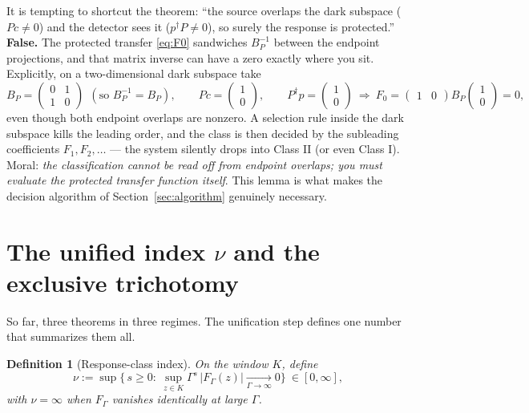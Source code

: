 \documentclass[11pt]{article}
\newtheorem{definition}{Definition}
\begin{document}
It is tempting to shortcut the theorem: ``the source overlaps the dark
subspace ($Pc\neq0$) and the detector sees it ($p^\dagger P\neq0$), so surely
the response is protected.''  \textbf{False.}  The protected transfer
\eqref{eq:F0} sandwiches $B_P^{-1}$ between the endpoint projections, and
that matrix inverse can have a zero exactly where you sit.  Explicitly, on a
two-dimensional dark subspace take
\[
B_P=\begin{pmatrix}0&1\\1&0\end{pmatrix}
\ \ (\text{so } B_P^{-1}=B_P),\qquad
Pc = \begin{pmatrix}1\\0\end{pmatrix},\qquad
P^\dagger p = \begin{pmatrix}1\\0\end{pmatrix}
\ \Longrightarrow\
F_0 = \begin{pmatrix}1&0\end{pmatrix}B_P\begin{pmatrix}1\\0\end{pmatrix}=0,
\]
even though both endpoint overlaps are nonzero.  A selection rule inside the
dark subspace kills the leading order, and the class is then decided by the
subleading coefficients $F_1,F_2,\dots$ --- the system silently drops into
Class II (or even Class I).  Moral: \emph{the classification cannot be read
off from endpoint overlaps; you must evaluate the protected transfer
function itself}.  This lemma is what makes the decision algorithm of
Section~\ref{sec:algorithm} genuinely necessary.

\section{The unified index $\nu$ and the exclusive trichotomy}
\label{sec:trichotomy}

So far, three theorems in three regimes.  The unification step defines one
number that summarizes them all.

\begin{definition}[Response-class index]
On the window $K$, define
\[
\nu:=\sup\Big\{\,s\ge0:\ \sup_{z\in K}\Gamma^{s}\,|F_\Gamma(z)|
\xrightarrow[\Gamma\to\infty]{}0\Big\}\ \in[0,\infty],
\]
with $\nu=\infty$ when $F_\Gamma$ vanishes identically at large $\Gamma$.
\end{definition}
\end{document}
